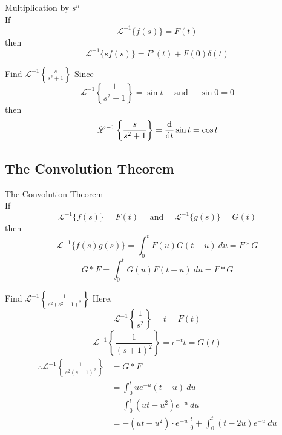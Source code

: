 \documentclass[12pt]{article}
\newcommand{\Lapinv}{\mathscr{L}^{-1}}
\begin{document}
\begin{theorem}{Multiplication by $s^n$}{}
    \\If \[
        \Lapinv \{ f(s) \} = F(t)
    \] then \[
        \Lapinv \{ s f(s) \} = F'(t) + F(0)\delta(t)
    \]
\end{theorem}

\begin{example}{Find $\displaystyle \Lapinv \left\{ \frac{s}{s^2+1} \right\}$}{}
    Since \[
        \Lapinv \left\{ \frac{1}{s^2+1} \right\} = \sin{t} \quad \text{ and } \quad \sin{0} = 0
    \] then \[
        \Lapinv \left\{ \frac{s}{s^2+1} \right\} = \dv{t} \sin{t} = \cos{t}
    \]
\end{example}


\subsection{The Convolution Theorem}

\begin{theorem}{The Convolution Theorem}{}
    \\If \[
        \Lapinv \{ f(s) \} = F(t) \quad \text{ and } \quad \Lapinv \{ g(s) \} = G(t)
    \] then \[
        \Lapinv \{ f(s)g(s) \} = \int_{0}^{t} {F(u)G(t-u)} \: d{u} = F * G
    \] \[
        G*F = \int_{0}^{t} {G(u)F(t-u)} \: d{u} = F*G
    \]
\end{theorem}

\begin{example}{Find $\displaystyle \Lapinv \left\{ \frac{1}{s^2(s^2+1)^2} \right\}$}{}
    Here, \[
        \Lapinv \left\{ \frac{1}{s^2} \right\} = t = F(t)
    \] \[
        \Lapinv \left\{ \frac{1}{(s+1)^2} \right\} = e^{-t}t = G(t)
    \]
    \begin{align*}
        \therefore \Lapinv \left\{ \frac{1}{s^2(s+1)^2} \right\} &= G*F \\
        &= \int_{0}^{t} {ue^{-u} (t-u)} \: d{u} \\
        &= \int_{0}^{t} {(ut - u^2)e^{-u}} \: d{u}  \\
        &= -(ut-u^2) \cdot e^{-u} \bigg|_{0}^{t} + \int_{0}^{t} {(t - 2u)e^{-u}} \: d{u}
    \end{align*}
\end{example}
\end{document}
